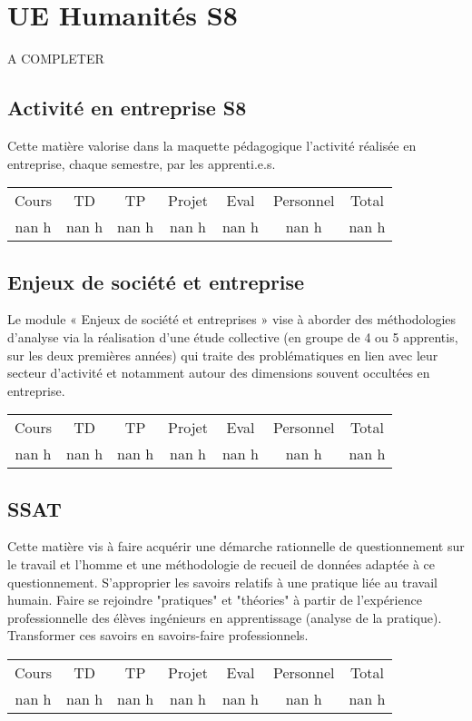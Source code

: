 \section{UE Humanités S8}%
\label{sec:UEHumanitsS8}%
A COMPLETER%
\subsection{Activité en entreprise S8}%
\label{subsec:ActivitenentrepriseS8}%

%
Cette matière valorise dans la maquette pédagogique l'activité réalisée en entreprise, chaque semestre, par les apprenti.e.s.%
\begin{longtable}{c c c c c c c}%
\hline%
Cours&TD&TP&Projet&Eval&Personnel&Total\\%
nan h&nan h&nan h&nan h&nan h&nan h&nan h\\%
\hline%
\end{longtable}%
\subsection{Enjeux de société et entreprise}%
\label{subsec:Enjeuxdesocitetentreprise}%

%
 Le module « Enjeux de société et entreprises » vise à aborder des méthodologies d’analyse via la réalisation d’une étude collective (en groupe de 4 ou 5 apprentis, sur les deux premières années) qui traite des problématiques en lien avec leur secteur d’activité et notamment autour des dimensions souvent occultées en entreprise.%
\begin{longtable}{c c c c c c c}%
\hline%
Cours&TD&TP&Projet&Eval&Personnel&Total\\%
nan h&nan h&nan h&nan h&nan h&nan h&nan h\\%
\hline%
\end{longtable}%
\subsection{SSAT}%
\label{subsec:SSAT}%

%
Cette matière vis à faire acquérir une démarche rationnelle de questionnement sur le travail et l'homme et une méthodologie de recueil de données adaptée à ce questionnement. S'approprier les savoirs relatifs à une pratique liée au travail humain. Faire se rejoindre "pratiques" et "théories" à partir de l'expérience professionnelle des élèves ingénieurs en apprentissage (analyse de la pratique). Transformer ces savoirs en savoirs{-}faire professionnels. %
\begin{longtable}{c c c c c c c}%
\hline%
Cours&TD&TP&Projet&Eval&Personnel&Total\\%
nan h&nan h&nan h&nan h&nan h&nan h&nan h\\%
\hline%
\end{longtable}%
